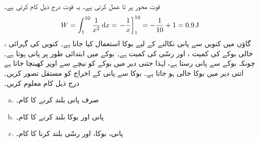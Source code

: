 قوت  محور  پر  تا  عمل کرتی ہے۔ یہ قوت درج ذیل کام کرتی ہے۔
\begin{align*}
W=\int_1^{10}\frac{1}{x^2}\dif x=\left.-\frac{1}{x}\right]_1^{10}=-\frac{1}{10}+1=\SI{0.9}{\joule}
\end{align*}
گاؤں میں کنویں سے پانی نکالنے کے لیے بوکا استعمال کیا جاتا ہے۔ کنویں  کی گہرائی ، خالی بوکے  کی کمیت ،  اور رسّی کی کمیت  ہے۔ بوکے  میں ابتدائی طور پر  پانی ہوتا ہے۔چونکہ بوکے سے پانی رستا ہے، لہٰذا جتنی دیر میں بوکے کو نیچے سے اوپر کھینچا جاتا ہے اتنی دیر میں بوکا خالی ہو جاتا ہے۔ بوکا سے پانی کے اخراج کو مستقل تصور کریں۔ درج ذیل کام معلوم کریں۔ 
\begin{enumerate}[a.]
\item
صرف پانی بلند کرنے کا کام۔
\item
پانی اور بوکا بلند کرنے کا کام۔
\item
پانی، بوکا، اور رسّی بلند کرنا کا کام۔
\end{enumerate}
